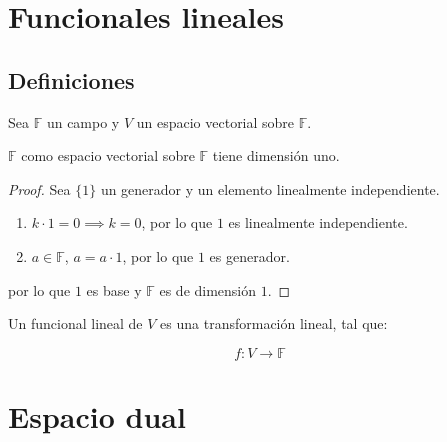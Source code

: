 
\section{Funcionales lineales}

	\subsection{Definiciones}

		\begin{lema}
			Sea $\mathbb{F}$ un campo y $V$ un espacio vectorial sobre $\mathbb{F}$.

			$\mathbb{F}$ como espacio vectorial sobre $\mathbb{F}$ tiene dimensión uno.
		\end{lema}

		\begin{proof}
			Sea $\{1\}$ un generador y un elemento linealmente independiente.

			\begin{enumerate}
				\item $k \cdot 1 = 0 \implies k = 0$, por lo que $1$ es linealmente independiente.
				\item $a \in \mathbb{F}$, $a = a \cdot 1$, por lo que $1$ es generador.
			\end{enumerate}

			por lo que $1$ es base y $\mathbb{F}$ es de dimensión $1$.
		\end{proof}

		\begin{definicion}
			Un funcional lineal de $V$ es una transformación lineal, tal que:

			\begin{equation}
				f \colon V \to \mathbb{F}
			\end{equation}
		\end{definicion}


\section{Espacio dual}

